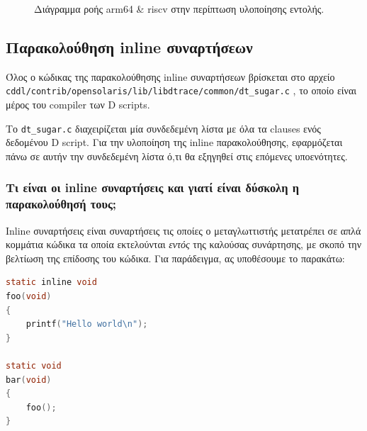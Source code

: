 \documentclass[12pt]{article}
\begin{document}
\begin{figure}[H]
\begin{center}
\end{center}
\caption{Διάγραμμα ροής arm64 \& riscv στην περίπτωση υλοποίησης εντολής.}
\label{armriscvflow}
\end{figure}

\subsection{Παρακολούθηση inline συναρτήσεων} \label{inlinetrace}

Όλος ο κώδικας της παρακολούθησης inline συναρτήσεων βρίσκεται στο αρχείο
\lstinline{cddl/contrib/opensolaris/lib/libdtrace/common/dt_sugar.c}
\cite{inlinesrc}, το οποίο είναι μέρος του compiler των D scripts.

Το \lstinline{dt_sugar.c} διαχειρίζεται μία συνδεδεμένη λίστα με όλα τα clauses
ενός δεδομένου D script. Για την υλοποίηση της inline παρακολούθησης,
εφαρμόζεται πάνω σε αυτήν την συνδεδεμένη λίστα ό,τι θα εξηγηθεί στις επόμενες
υποενότητες.

\subsubsection{Τι είναι οι inline συναρτήσεις και γιατί είναι δύσκολη η
παρακολούθησή τους;}

Inline συναρτήσεις είναι συναρτήσεις τις οποίες ο μεταγλωττιστής μετατρέπει σε
απλά κομμάτια κώδικα τα οποία εκτελούνται \textit{εντός} της καλούσας
συνάρτησης, με σκοπό την βελτίωση της επίδοσης του κώδικα. Για παράδειγμα, ας
υποθέσουμε το παρακάτω:

\begin{lstlisting}[language=C]
static inline void
foo(void)
{
	printf("Hello world\n");
}

static void
bar(void)
{
	foo();
}
\end{lstlisting}
\end{document}

